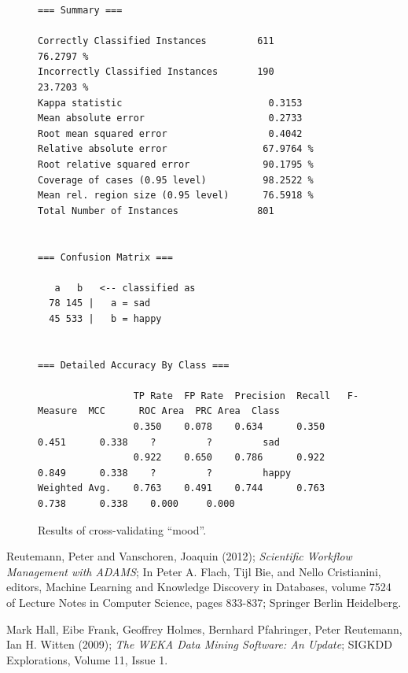 \documentclass[a4paper,10pt]{book}
\begin{document}
\begin{figure}[htb]
  \centering
  {\scriptsize
  \begin{verbatim}
=== Summary ===

Correctly Classified Instances         611               76.2797 %
Incorrectly Classified Instances       190               23.7203 %
Kappa statistic                          0.3153
Mean absolute error                      0.2733
Root mean squared error                  0.4042
Relative absolute error                 67.9764 %
Root relative squared error             90.1795 %
Coverage of cases (0.95 level)          98.2522 %
Mean rel. region size (0.95 level)      76.5918 %
Total Number of Instances              801     


=== Confusion Matrix ===

   a   b   <-- classified as
  78 145 |   a = sad
  45 533 |   b = happy


=== Detailed Accuracy By Class ===

                 TP Rate  FP Rate  Precision  Recall   F-Measure  MCC      ROC Area  PRC Area  Class
                 0.350    0.078    0.634      0.350    0.451      0.338    ?         ?         sad
                 0.922    0.650    0.786      0.922    0.849      0.338    ?         ?         happy
Weighted Avg.    0.763    0.491    0.744      0.763    0.738      0.338    0.000     0.000     
  \end{verbatim}}
  \caption{Results of cross-validating ``mood''.}
  \label{crossvalidate_csv_archive-flow}
\end{figure}

\begin{thebibliography}{999}

		Reutemann, Peter and Vanschoren, Joaquin (2012); 
		\textit{Scientific Workflow Management with ADAMS};
		In Peter A. Flach, Tijl Bie, and Nello Cristianini, editors, 
		Machine Learning and Knowledge Discovery in Databases, 
		volume 7524 of Lecture Notes in Computer Science, pages 
		833-837; Springer Berlin Heidelberg.
		
	    Mark Hall, Eibe Frank, Geoffrey Holmes, Bernhard Pfahringer, Peter 
	    Reutemann, Ian H. Witten (2009); \textit{The WEKA Data Mining Software: An 
	    Update}; SIGKDD Explorations, Volume 11, Issue 1. 

\end{thebibliography}
\end{document}
